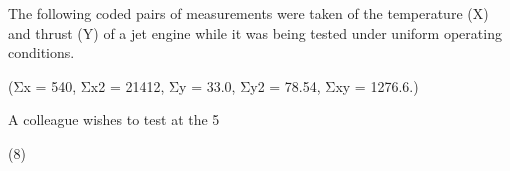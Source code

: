  

 

The following coded pairs of measurements were taken of the temperature (X) and thrust (Y) of a jet engine while it was being tested under uniform operating conditions.


(Σx = 540, Σx2 = 21412, Σy = 33.0, Σy2 = 78.54, Σxy = 1276.6.)



A colleague wishes to test at the 5%

(8)


